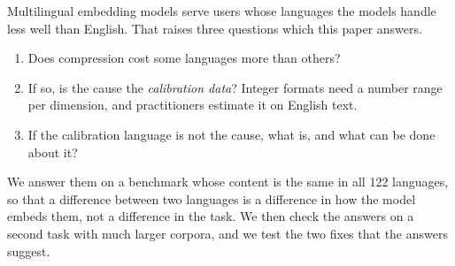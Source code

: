 \documentclass[10pt]{article}
\begin{document}
Multilingual embedding models serve users whose languages the models handle less well than English. That raises three questions which this paper answers.
\begin{enumerate}[nosep]
\item Does compression cost some languages more than others?
\item If so, is the cause the \emph{calibration data}? Integer formats need a number range per dimension, and practitioners estimate it on English text.
\item If the calibration language is not the cause, what is, and what can be done about it?
\end{enumerate}
We answer them on a benchmark whose content is the same in all 122 languages, so that a difference between two languages is a difference in how the model embeds them, not a difference in the task. We then check the answers on a second task with much larger corpora, and we test the two fixes that the answers suggest.
\end{document}
